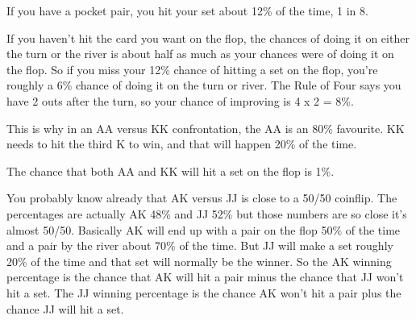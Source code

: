 If you have a pocket pair, you hit your set about 12\% of the time, 1
in 8.

If you haven't hit the card you want on the flop, the chances of doing
it on either the turn or the river is about half as much as your
chances were of doing it on the flop. So if you miss your 12\% chance
of hitting a set on the flop, you're roughly a 6\% chance of doing it
on the turn or river. The Rule of Four says you have 2 outs after the
turn, so your chance of improving is 4 x 2 = 8\%.

This is why in an AA versus KK confrontation, the AA is an 80\%
favourite. KK needs to hit the third K to win, and that will happen
20\% of the time.

The chance that both AA and KK will hit a set on the flop is 1\%.

You probably know already that AK versus JJ is close to a 50/50 coinflip.
The percentages are actually AK 48\% and JJ 52\% but those numbers are so
close it's almost 50/50. Basically AK will end up with a pair on the
flop 50\% of the time and a pair by the river about 70\% of the
time. But JJ will make a set roughly 20\% of the time and that set
will normally be the winner. So the AK winning percentage is the
chance that AK will hit a pair minus the chance that JJ won't hit a
set. The JJ winning percentage is the chance AK won't hit a pair plus
the chance JJ will hit a set.



